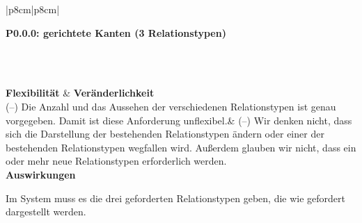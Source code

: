 \documentclass[enabledeprecatedfontcommands,fontsize=11pt,paper=a4,twoside]{scrartcl}
\newcounter{one}
\newcounter{two}[one]
\newcounter{three}[two]
\newcommand{\tone}{0\theone}
\newcommand{\ttwo}{0\thetwo}
\newcommand{\three}{\stepcounter{three}0\thethree}
\begin{document}
\begin{tabular} {|p{8cm}|p{8cm}|}
	\hline
	 {\parbox{16cm}{\textbf{\hypertarget{q}{P\tone.\ttwo.\three}: gerichtete Kanten (3 Relationstypen)}} } \\ \hline\hline 
	\rule{0pt}{10ex}\\ [7ex] \hline
	\textbf{Flexibilität}  & \textbf{Veränderlichkeit} \\
	(–) Die Anzahl und das Aussehen der verschiedenen Relationstypen ist genau vorgegeben. Damit ist diese Anforderung unflexibel.&
	(–) Wir denken nicht, dass sich die Darstellung der bestehenden Relationstypen ändern oder einer der bestehenden Relationstypen wegfallen wird. Außerdem glauben wir nicht, dass ein oder mehr neue Relationstypen erforderlich werden. \\
	\hline
	 {\textbf{Auswirkungen}} \\
	 {\parbox{16cm}{Im System muss es die drei geforderten Relationstypen geben, die wie gefordert dargestellt werden.} }\\ \hline
\end{tabular}
\\ \\ \\ \\%
\end{document}
